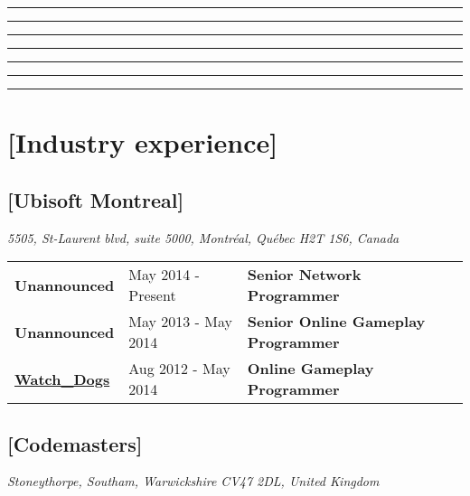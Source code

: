 \documentclass[a4paper]{res}
\newcommand{\setrule}[1]{\rule{#1}{1mm}}
\newcommand{\fibrule}[2]{ \hspace{#1}  \setrule{#2} \setrule{21mm} \setrule{13mm} \setrule{8mm} \setrule{5mm} \setrule{3mm} \setrule{2mm}  \vspace{-.52in} }
\begin{document}
\begin{resume}
\fibrule{2.15in}{1.75in}
\section{[Industry experience]}

\vspace{-.2in}



\subsection{[Ubisoft Montreal]}\textit{5505, St-Laurent blvd, suite 5000, Montréal, Québec H2T 1S6, Canada}

\vspace{-.15in}
\begin{tabular}{| l@{\hskip 1.29in} | l | l }

{\bf Unannounced }                                                                                          & May 2014 - Present       & {\bf Senior Network Programmer} \\
{\bf Unannounced }                                                                                          & May 2013 - May 2014    & {\bf Senior Online Gameplay Programmer} \\
\href{http://nathanrosspowell.com/games/watchdogs/}{\bf Watch\_Dogs } & Aug 2012 - May 2014   & {\bf Online Gameplay Programmer} \\

\end{tabular}
\vspace{-.3in}

\subsection{[Codemasters]}\textit{Stoneythorpe, Southam, Warwickshire CV47 2DL, United Kingdom}

\vspace{-.15in}
\begin{tabular}{| l | l@{\hskip .12in} | l }


\end{tabular}
\end{resume}
\end{document}
